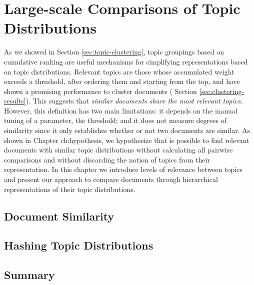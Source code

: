 

\chapter{Large-scale Comparisons of Topic Distributions}\label{ch:comparisons}

\graphicspath{{comparisons/figures/}}


As we showed in Section \ref{sec:topic-clustering}, topic groupings based on cumulative ranking are useful mechanisms for simplifying representations based on topic distributions. Relevant topics are those whose accumulated weight exceeds a threshold, after ordering them and starting from the top, and have shown a promising performance to cluster documents ( Section \ref{sec:clustering-results}). This suggests that \textit{similar documents share the most relevant topics}. However, this definition has two main limitations: it depends on the manual tuning of a parameter, the threshold; and it does not measure degrees of similarity since it only establishes whether or not two documents are similar. As shown in Chapter {ch:hypothesis}, we hypothesize that is possible to find relevant documents with similar topic distributions without calculating all pairwise comparisons and without discarding the notion of topics from their representation. In this chapter we introduce levels of relevance between topics and present our approach to compare documents through hierarchical representations of their topic distributions.

\section{Document Similarity}

\section{Hashing Topic Distributions}

\section{Summary}

